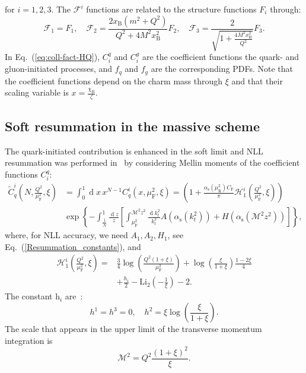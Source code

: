 \documentclass[letterpaper,11pt]{article}
\newcommand{\as}{\alpha_\text{s}}
\newcommand{\cf}{C_{\text{F}}}
\DeclareMathOperator{\De}{d}
\newcommand{\de}{\De\!}
\newcommand{\xb}{x_{\text{B}}}
\newcommand{\chib}{\chi_{\text{B}}}
\newcommand{\muf}{\mu_{\text{F}}}
\newcommand{\mur}{\mu_{\text{R}}}
\begin{document}
for $i=1,2,3$. 
The $\mathcal{F}^i$ functions are related to the structure functions $F_i$ through:
\begin{equation}
		\mathcal{F}_1=F_1, \quad 
		\mathcal{F}_2=\frac{2 \xb(m^2+Q^2)}{Q^2+4M^2 \xb^2} F_2, \quad 
		\mathcal{F}_3=\frac{2}{\sqrt{1+\frac{4 M^2 \xb^2}{Q^2}}} F_3.
\end{equation}
In Eq.~(\ref{eq:coll-fact-HQ}), $C_i^q$ and $C_i^g$ are the coefficient functions the quark- and gluon-initiated processes, and $f_q$ and $f_g$ are the corresponding PDFs.
%
Note that the coefficient functions depend on the charm mass through $\xi$ and that their scaling variable is $x=\frac{\chib}{\zeta}$.

\subsection{Soft resummation in the massive scheme}\label{sec:massive_NLL}
The quark-initiated contribution is enhanced in the soft limit and NLL resummation was performed in~\cite{Corcella:2003ib} by considering Mellin moments of the coefficient functions $C_i^q$:
\begin{align}\label{eq:resummed_DIS_massive}
\widetilde{C}^i_q\left(N,\frac{Q^2}{\muf^2},\xi\right)&= \int_0^1 \de  x \, x^{N-1}
C^i_q\left(x,\muf^2,\xi\right) 
=\left(1+ \frac{\as(\mur^2)\cf }{\pi}\mathcal{H}^i_1\left(\frac{Q^2}{\muf^2},\xi\right)\right) \nonumber \\
&
\exp\left\{-\int^{1}_{\frac{1}{\bar N}} \frac{\de z}{z} \left[\int^{\mathcal{M}^2 z^2}_{\muf^2} \frac{\de k_t^2}{k_t^2} A\left(\as(k_t^2)\right)+H\left(\as\left(\mathcal{M}^2z^2\right)\right)\right]\right\},
\end{align}
where, for NLL accuracy, we need $A_1,A_2,H_1$, see Eq.~(\ref{Resummation_constants}), and
\begin{align}
		\mathcal{H}^i_1\left(\frac{Q^2}{\muf^2},\xi\right)=& \frac{3}{4} \log{\left(\frac{Q^2(1+\xi)}{\muf^2}\right)}+\log{\left(\frac{\xi}{1+\xi}\right)}\frac{1-2\xi}{4}\\
		&+\frac{h_i}{2}-\text{Li}_2\left(-\frac{1}{\xi}\right)-2.
\end{align}
The constant $\textit{h}_i$ are~\cite{Gluck:1996ve}:
\begin{equation}
h^1=h^3=0,\quad h^2= \xi \log{\left(\frac{\xi}{1+\xi}\right)}.
\end{equation}
The scale that appears in the upper limit of the transverse momentum integration is 
\begin{equation}\label{eq:DIS_mass_scale}
\mathcal{M}^2=Q^2\frac{(1+\xi)^2}{\xi}.
\end{equation}
\end{document}
